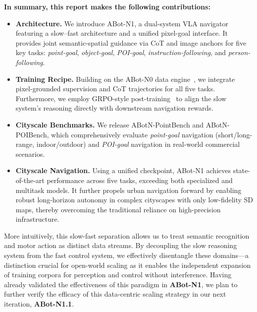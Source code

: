 \textbf{In summary, this report makes the following contributions:}
\begin{itemize}
  \item \textbf{Architecture.} We introduce ABot-N1, a dual-system VLA navigator featuring a slow–fast architecture and a unified pixel-goal interface. It provides joint semantic-spatial guidance via CoT and image anchors for five key tasks: \textit{point-goal}, \textit{object-goal}, \textit{POI-goal}, \textit{instruction-following}, and \textit{person-following}.
  
  \item \textbf{Training Recipe.} Building on the ABot-N0 data engine~\cite{abotn0}, we integrate pixel-grounded supervision and CoT trajectories for all five tasks. Furthermore, we employ GRPO-style post-training~\cite{deepseekai2025r1} to align the slow system's reasoning directly with downstream navigation rewards.
  
  \item \textbf{Cityscale Benchmarks.} We release ABotN-PointBench and ABotN-POIBench, which comprehensively evaluate \textit{point-goal} navigation (short/long-range, indoor/outdoor) and \textit{POI-goal} navigation in real-world commercial scenarios.
  
  \item \textbf{Cityscale Navigation.} Using a unified checkpoint, ABot-N1 achieves state-of-the-art performance across five tasks, exceeding both specialized and multitask models. It further propels urban navigation forward by enabling robust long-horizon autonomy in complex cityscapes with only low-fidelity SD maps, thereby overcoming the traditional reliance on high-precision infrastructure.
  
\end{itemize}

More intuitively, this slow-fast separation allows us to treat semantic recognition and motor action as distinct data streams. By decoupling the slow reasoning system from the fast control system, we effectively disentangle these domains—a distinction crucial for open-world scaling as it enables the independent expansion of training corpora for perception and control without interference. Having already validated the effectiveness of this paradigm in \textbf{ABot-N1}, we plan to further verify the efficacy of this data-centric scaling strategy in our next iteration, \textbf{ABot-N1.1}.